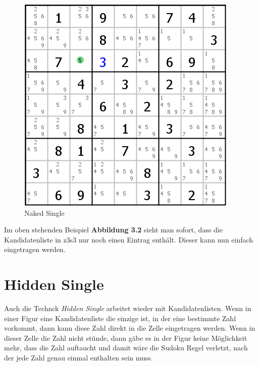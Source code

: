 \documentclass[accentcolor=tud6b,11pt,paper=a4]{tudreport}
\begin{document}
\begin{figure}[h]
\begin{center}
\includegraphics{./img/naked_single.png}
\caption{Naked Single}
\end{center}
\end{figure}

Im oben stehenden Beispiel \textbf{Abbildung 3.2} sieht man sofort, dass die Kandidatenliste in z3s3 nur noch einen Eintrag enthält. Dieser kann nun einfach eingetragen werden.
\newpage
\section{Hidden Single}
Auch die Technck \textit{Hidden Single} arbeitet wieder mit Kandidatenlisten. Wenn in einer Figur eine Kandidatenliste die einzige ist, in der eine bestimmte Zahl vorkommt, dann kann diese Zahl direkt in die Zelle eingetragen werden. Wenn in dieser Zelle die Zahl nicht stünde, dann gäbe es in der Figur keine Möglichkeit mehr, dass die Zahl auftaucht und damit wäre die Sudoku Regel verletzt, nach der jede Zahl genau einmal enthalten sein muss.
\end{document}
